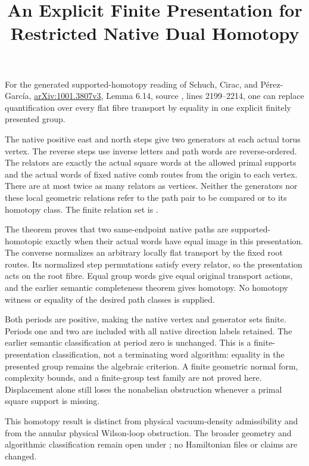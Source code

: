 \documentclass{article}
\title{An Explicit Finite Presentation for Restricted Native Dual Homotopy}
\author{}
\date{}
\begin{document}
\maketitle
{}

For the generated supported-homotopy reading of Schuch, Cirac, and
P\'erez-Garc\'ia, \href{https://arxiv.org/abs/1001.3807v3}{arXiv:1001.3807v3},
Lemma 6.14, source , lines 2199--2214,
one can replace quantification over every flat fibre transport by equality
in one explicit finitely presented group.

The native positive east and north steps give two generators at each
actual torus vertex. The reverse steps use inverse letters and path words
are reverse-ordered. The relators are exactly the actual square words at
the allowed primal supports and the actual words of fixed native comb
routes from the origin to each vertex. There are at most twice as many
relators as vertices. Neither the generators nor these local geometric
relations refer to the path pair to be compared or to its homotopy class.
The finite relation set is
.

The theorem
proves that two same-endpoint native paths are supported-homotopic exactly
when their actual words have equal image in this presentation. The converse
normalizes an arbitrary locally flat transport by the fixed root routes.
Its normalized step permutations satisfy every relator, so the presentation
acts on the root fibre. Equal group words give equal original transport
actions, and the earlier semantic completeness theorem gives homotopy.
No homotopy witness or equality of the desired path classes is supplied.

Both periods are positive, making the native vertex and generator sets
finite. Periods one and two are included with all native direction labels
retained. The earlier semantic classification at period zero is unchanged.
This is a finite-presentation classification, not a terminating word
algorithm: equality in the presented group remains the algebraic criterion.
A finite geometric normal form, complexity bounds, and a finite-group test
family are not proved here. Displacement alone still loses the nonabelian
obstruction whenever a primal square support is missing.

This homotopy result is distinct from physical vacuum-density admissibility
and from the annular physical Wilson-loop obstruction. The broader geometry
and algorithmic classification remain open under ; no
 Hamiltonian files or claims are changed.
\end{document}
